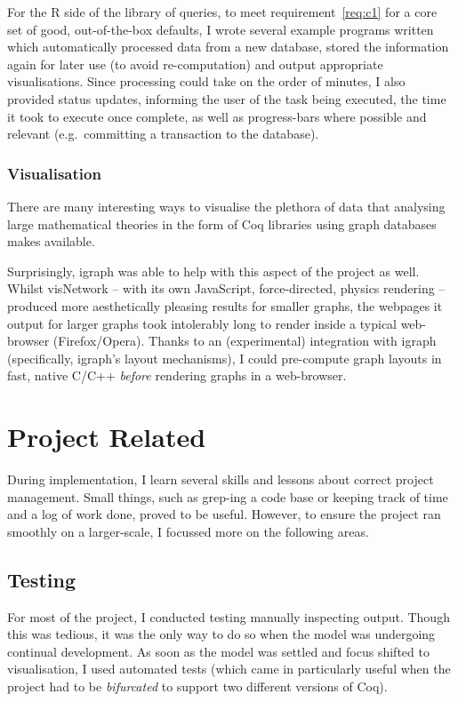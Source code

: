 For the R side of the library of queries, to meet requirement~\ref{req:c1} for
a core set of good, out-of-the-box defaults, I wrote several example programs
written which automatically processed data from a new database, stored the
information again for later use (to avoid re-computation) and output
appropriate visualisations. Since processing could take on the order of
minutes, I also provided status updates, informing the user of the task being
executed, the time it took to execute once complete, as well as progress-bars
where possible and relevant (e.g.\ committing a transaction to the database).

\subsubsection{Visualisation}

There are many interesting ways to visualise the plethora of data that
analysing large mathematical theories in the form of Coq libraries using graph
databases makes available.

Surprisingly, igraph was able to help with this aspect of the project as well.
Whilst visNetwork -- with its own JavaScript, force-directed, physics rendering
-- produced more aesthetically pleasing results for smaller graphs, the webpages
it output for larger graphs took intolerably long to render inside a typical
web-browser (Firefox/Opera). Thanks to an (experimental) integration with igraph
(specifically, igraph's layout mechanisms), I could pre-compute graph layouts in
fast, native C/C++ \emph{before} rendering graphs in a web-browser.

\section{Project Related}

During implementation, I learn several skills and lessons about correct project
management. Small things, such as grep-ing a code base or keeping track of time
and a log of work done, proved to be useful. However, to ensure the project ran
smoothly on a larger-scale, I focussed more on the following areas.

\subsection{Testing}

For most of the project, I conducted testing manually inspecting output. Though
this was tedious, it was the only way to do so when the model was undergoing
continual development. As soon as the model was settled and focus shifted to
visualisation, I used automated tests (which came in particularly useful when
the project had to be \emph{bifurcated} to support two different versions of
Coq).

